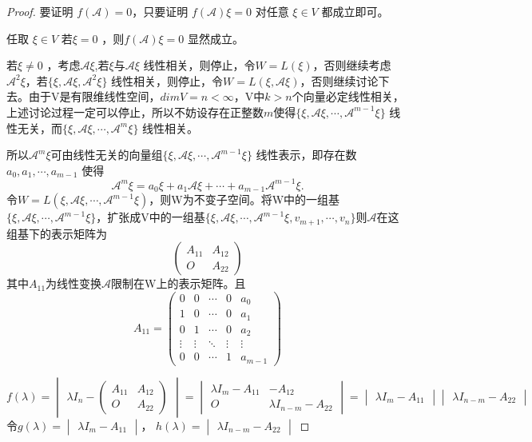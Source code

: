 \documentclass[lang=cn,12pt]{elegantbook}
\begin{document}
\begin{proof}
    要证明 \(f(\mathcal{A}) = 0\)，只要证明 \(f(\mathcal{A}) \xi = 0\) 对任意 \(\xi \in V\) 都成立即可。 \par
    任取 $\xi  \in V$ 若$\xi = 0$ ，则$f(\mathcal{A}) \xi = 0$ 显然成立。 \par
    若$\xi \neq 0$ ，考虑$\mathcal{A}\xi$,若$\xi$与$\mathcal{A}\xi$ 线性相关，则停止，令$W = L(\xi)$，否则继续考虑$\mathcal{A}^2\xi$，若$\{\xi,\mathcal{A}\xi,\mathcal{A}^2\xi\}$ 线性相关，则停止，令$W = L(\xi,\mathcal{A}\xi)$，否则继续讨论下去。由于V是有限维线性空间，$dim V = n < \infty$，V中$k >n$个向量必定线性相关，上述讨论过程一定可以停止，所以不妨设存在正整数$m$使得$\{\xi,\mathcal{A}\xi,\cdots,\mathcal{A}^{m-1}\xi\}$ 线性无关，而$\{\xi,\mathcal{A}\xi,\cdots,\mathcal{A}^m\xi\}$ 线性相关。 \par
    所以$\mathcal{A}^m\xi$可由线性无关的向量组$\{\xi,\mathcal{A}\xi,\cdots,\mathcal{A}^{m-1}\xi\}$ 线性表示，即存在数 $a_0, a_1, \cdots, a_{m-1}$ 使得
\[
\mathcal{A}^m\xi = a_0 \xi + a_1 \mathcal{A} \xi + \cdots + a_{m-1} \mathcal{A}^{m-1} \xi.
\]
    令$W = L(\xi,\mathcal{A}\xi,\cdots,\mathcal{A}^{m-1}\xi)$，则W为不变子空间。将W中的一组基$\{\xi,\mathcal{A}\xi,\cdots,\mathcal{A}^{m-1}\xi\}$，扩张成V中的一组基$\{\xi,\mathcal{A}\xi,\cdots,\mathcal{A}^{m-1}\xi,v_{m+1},\cdots,v_{n}\}$则$\mathcal{A}$在这组基下的表示矩阵为
\[
\begin{pmatrix}
A_{11} & A_{12} \\
O & A_{22}
\end{pmatrix}
\]
其中$A_{11}$为线性变换$\mathcal{A}$限制在W上的表示矩阵。且
\[
A_{11} = \begin{pmatrix}
0 & 0 & \cdots & 0 & a_0 \\
1 & 0 & \cdots & 0 & a_1 \\
0 & 1 & \cdots & 0 & a_2 \\
\vdots & \vdots & \ddots & \vdots & \vdots \\
0 & 0 & \cdots & 1 & a_{m-1}
\end{pmatrix}
\]

\[
f(\lambda) = \begin{vmatrix}
\lambda I_n - \begin{pmatrix}
A_{11} & A_{12} \\
O & A_{22}
\end{pmatrix}
\end{vmatrix} = \begin{vmatrix}
\lambda I_m - A_{11} & -A_{12} \\
O & \lambda I_{n-m} - A_{22}
\end{vmatrix} = \begin{vmatrix}
\lambda I_m - A_{11}
\end{vmatrix} \begin{vmatrix}
\lambda I_{n-m} - A_{22}
\end{vmatrix}
\]
令$g(\lambda) = \begin{vmatrix}
    \lambda I_m - A_{11}
    \end{vmatrix}$，
$h(\lambda) =  \begin{vmatrix}
    \lambda I_{n-m} - A_{22}
    \end{vmatrix}$


\end{proof}
\end{document}

